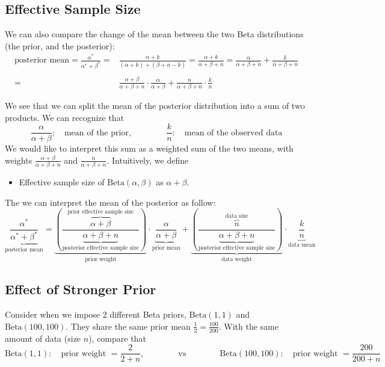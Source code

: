 \documentclass{article}
\def\dsst{\displaystyle}
\begin{document}
\subsection{Effective Sample Size}

We can also compare the change of the mean between the two Beta distributions (the prior, and the posterior):
\begin{align*}
\text{posterior mean} = \frac{\alpha^*}{\alpha^*+\beta^*} = &  \frac{\alpha+k}{(\alpha+k)+(\beta+n-k)}=\frac{\alpha+k}{\alpha+\beta+n} = \frac{\alpha}{\alpha+\beta+n} + \frac{k}{\alpha+\beta+n}\\
& \\
= & \frac{\alpha+\beta}{\alpha+\beta+n}\cdot \frac{\alpha}{\alpha+\beta} + \frac{n}{\alpha+\beta+n}\cdot \frac{k}{n}
\end{align*}


We see that we can split the mean of the posterior distribution into a sum of two products. We can recognize that 
$$ \frac{\alpha}{\alpha+\beta}:\quad \text{mean of the prior},\qquad \qquad \frac{k}{n}:\quad \text{mean of the observed data}$$
We would like to interpret this sum as a weighted sum of the two means, with weights $\dsst \frac{\alpha+\beta}{\alpha+\beta+n}$ and $\dsst \frac{n}{\alpha+\beta+n}$. Intuitively, we define
\begin{itemize}
	\item Effective sample size of $\text{Beta}(\alpha, \beta)$ as $\alpha + \beta$.
\end{itemize}

The we can interpret the mean of the posterior as follow:
$$\underbrace{\frac{\alpha^*}{\alpha^*+\beta^*}}_\text{posterior mean} = \underbrace{\left(\frac{\overbrace{\alpha+\beta}^\text{prior effective sample size}}{\underbrace{\alpha+\beta+n}_\text{posterior effective sample size}}\right)}_\text{prior weight}\cdot \underbrace{\frac{\alpha}{\alpha+\beta}}_\text{prior mean}+ \underbrace{\left(\frac{\overbrace{n}^\text{data size}}{\underbrace{\alpha+\beta+n}_\text{posterior effective sample size}}\right)}_\text{data weight}\cdot \underbrace{\frac{k}{n}}_\text{data mean} $$

\subsection{Effect of Stronger Prior}

Consider when we impose 2 different Beta priors, $\text{Beta}(1, 1)$ and $\text{Beta}(100, 100)$. They share the same prior mean $\dsst \frac{1}{2}=\frac{100}{200}$. With the same amount of data (size $n$), compare that
$$ \text{Beta}(1,1): \quad \text{prior weight }= \frac{2}{2+n},\qquad \qquad \text{vs} \qquad \qquad \text{Beta}(100, 100):\quad \text{prior weight }= \frac{200}{200+n} $$
\end{document}
